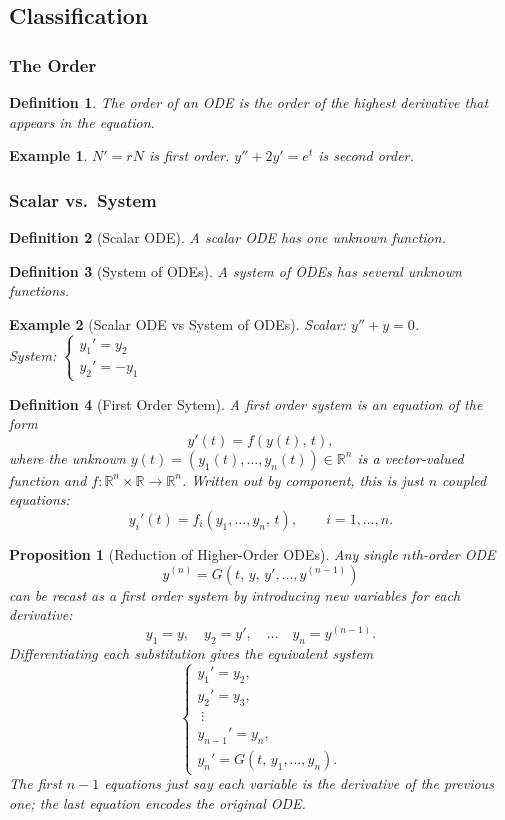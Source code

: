 \documentclass{article}
\newtheorem{definition}{Definition}
\newtheorem*{example}{Example}
\newtheorem{proposition}{Proposition}
\newcommand{\R}{\mathbb{R}}
\begin{document}
\subsection{Classification}
\subsubsection{The Order}
\begin{definition}
    The order of an ODE is the order of the highest derivative that appears in the equation.
\end{definition}
\begin{example}
    $N' = rN$ is first order. \quad $y'' + 2y' = e^t$ is second order.
\end{example}

\subsubsection{Scalar vs.\ System}
\begin{definition}[Scalar ODE]
    A scalar ODE has one unknown function.
\end{definition}
\begin{definition}[System of ODEs]
    A system of ODEs has several unknown functions.
\end{definition}
\begin{example}[Scalar ODE vs System of ODEs]

    Scalar: $y'' + y = 0$.\\
    System: $\begin{cases}y_1' = y_2\\y_2' = -y_1\end{cases}$
\end{example}
\begin{definition}[First Order Sytem]
    A first order system is an equation of the form
    \[y'(t) = f(y(t),\, t),\]
    where the unknown $y(t) = (y_1(t),\dots,y_n(t)) \in \R^n$ is a vector-valued
    function and $f : \R^n \times \R \to \R^n$. Written out by
    component, this is just $n$ coupled equations:
    \[y_i'(t) = f_i(y_1,\dots,y_n,\, t), \qquad i = 1,\dots,n.\]
\end{definition}
\begin{proposition}[Reduction of Higher-Order ODEs]
    Any single $n$th-order ODE
    \[y^{(n)} = G\!\left(t,\, y,\, y',\dots, y^{(n-1)}\right)\]
    can be recast as a first order system by introducing new variables for each derivative:
    \[y_1 = y, \quad y_2 = y', \quad \dots \quad y_n = y^{(n-1)}.\]
    Differentiating each substitution gives the equivalent system
    \[\begin{cases}y_1' = y_2, \\ y_2' = y_3, \\ \;\vdots \\ y_{n-1}' = y_n, \\ y_n' = G(t,\, y_1,\dots, y_n).\end{cases}\]
    The first $n-1$ equations just say each variable is the derivative of the previous
    one; the last equation encodes the original ODE.
\end{proposition}
\end{document}
